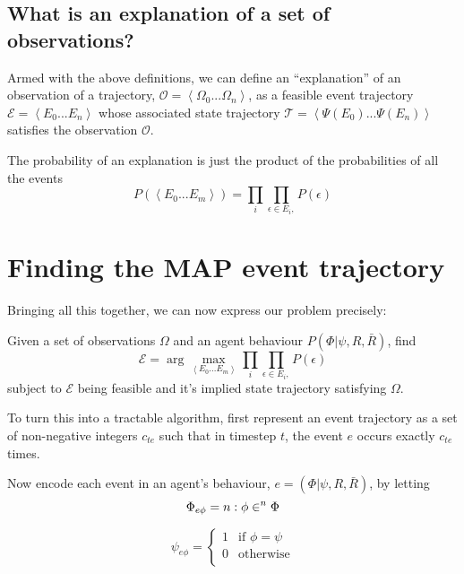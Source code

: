 \documentclass{article}
\begin{document}
\subsection{What is an explanation of a set of observations?}

Armed with the above definitions, we can define an ``explanation'' of an observation of a trajectory, $\mathcal{O} = \left<\Omega_0...\Omega_n\right>$, as a feasible event trajectory $\mathcal{E} = \left<E_0...E_n\right>$ whose associated state trajectory $\mathcal{T} = \left<\Psi(E_0)...\Psi(E_n)\right>$ satisfies the observation $\mathcal{O}$.

The probability of an explanation is just the product of the probabilities of all the events
\[
P(\left<E_0...E_m\right>) = \prod_{i}\prod_{\epsilon\in E_i, }P(\epsilon)
\]

\section{Finding the MAP event trajectory}

Bringing all this together, we can now express our problem precisely:

Given a set of observations $\Omega$ and an agent behaviour $P(\Phi|\psi,R,\bar{R})$, find
\begin{equation}
\mathcal{E} = \arg\max_{\left<E_0...E_m\right>}\prod_{i}\prod_{\epsilon\in E_i, }P(\epsilon)
\end{equation}
subject to $\mathcal{E}$ being feasible and it's implied state trajectory satisfying $\Omega$.

To turn this into a tractable algorithm, first represent an event trajectory as a set of non-negative integers $c_{te}$ such that in timestep $t$, the event $e$ occurs exactly $c_{te}$ times.

Now encode each event in an agent's behaviour, $e = (\Phi|\psi,R,\bar{R})$, by letting 
\begin{equation}
\Phi_{e\phi} = n: \phi \in^n \Phi\\
\end{equation}

\begin{equation}
\psi_{e\phi} = 
\begin{cases}
1&\text{if } \phi = \psi\\
0&\text{otherwise}\\
\end{cases}
\end{equation}
\end{document}

